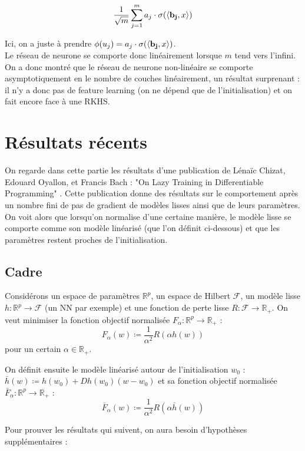 \documentclass[a4paper, 11pt, french]{article}
\theoremstyle{definition}
\begin{document}
	\[ \frac{1}{\sqrt{m}} \sum_{j=1}^{m} a_j \cdot \sigma (\langle {\bf b_j}, x \rangle) \]
	
	Ici, on a juste à prendre $\phi (u_j) = a_j \cdot \sigma (\langle {\bf b_j}, x \rangle)$. \\
	
	Le réseau de neurone se comporte donc linéairement lorsque $m$ tend vers l'infini. On a donc montré que le réseau de neurone non-linéaire se comporte asymptotiquement en le nombre de couches linéairement, un résultat surprenant : il n'y a donc pas de feature learning (on ne dépend que de l'initialisation) et on fait encore face à une RKHS.
	
	\newpage
	
	\section{Résultats récents}
	
	On regarde dans cette partie les résultats d'une publication de Lénaïc Chizat, Edouard Oyallon, et Francis Bach : "On Lazy Training in Differentiable Programming" \cite{chizat}. Cette publication donne des résultats sur le comportement après un nombre fini de pas de gradient de modèles lisses ainsi que de leurs paramètres. On voit alors que lorsqu'on normalise d'une certaine manière, le modèle lisse se comporte comme son modèle linéarisé (que l'on définit ci-dessous) et que les paramètres restent proches de l'initialisation.
	
	\subsection{Cadre}
	
	Considérons un espace de paramètres $\mathbb{R}^p$, un espace de Hilbert $\mathcal{F}$, un modèle lisse $h : \mathbb{R}^p \to \mathcal{F}$ (un NN par exemple) et une fonction de perte lisse $R : \mathcal{F} \to \mathbb{R}_+$. On veut minimiser la fonction objectif normalisée $F_{\alpha} : \mathbb{R}^p \to \mathbb{R}_+$ : \[F_{\alpha} (w) \coloneqq \frac{1}{\alpha^2} R(\alpha h(w))\] pour un certain $\alpha \in \mathbb{R}_+$.
	
	On définit ensuite le modèle linéarisé autour de l'initialisation $w_0$ : $\bar{h} (w) \coloneqq h(w_0) + Dh(w_0)(w - w_0)$ et sa fonction objectif normalisée $\bar{F}_{\alpha} : \mathbb{R}^p \to \mathbb{R}_+$ : \[\bar{F}_{\alpha} (w) \coloneqq \frac{1}{\alpha^2} R(\alpha \bar{h}(w))\]
	
	Pour prouver les résultats qui suivent, on aura besoin d'hypothèses supplémentaires :
		
\end{document}
